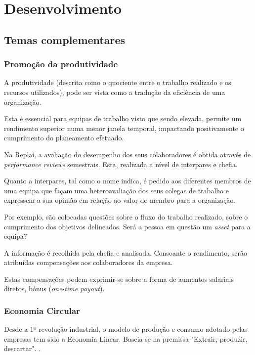 \chapter{Desenvolvimento}

\section{Temas complementares}

\subsection{Promoção da produtividade}

A produtividade (descrita como o quociente entre o trabalho realizado e os recursos utilizados), pode ser vista como a tradução da eficiência de uma organização.
 
Esta é essencial para equipas de trabalho visto que sendo elevada, permite um rendimento superior numa menor janela temporal, impactando positivamente o cumprimento do planeamento efetuado.
  
Na Replai, a avaliação do desempenho dos seus colaboradores é obtida através de \textit{performance reviews} semestrais. 
Esta, realizada a nível de interpares e chefia.  
  
Quanto a interpares, tal como o nome indica, é pedido aos diferentes membros de uma equipa que façam uma heteroavaliação dos seus colegas de trabalho e expressem a sua opinião em relação ao valor do membro para a organização.  
  
Por exemplo, são colocadas questões sobre o fluxo do trabalho realizado, sobre o cumprimento dos objetivos delineados. Será a pessoa em questão um \textit{asset} para a equipa?
  
A informação é recolhida pela chefia e analisada. Consoante o rendimento, serão atribuídas compensações aos colaboradores da empresa.
  
Estas compensações podem exprimir-se sobre a forma de aumentos salariais diretos, bónus (\textit{one-time payout}).



\subsection{Economia Circular}
Desde a 1º revolução industrial, o modelo de produção e consumo adotado pelas empresas tem sido a Economia Linear. Baseia-se na premissa "Extrair, produzir, descartar".
\cite{EconomiaLinear}.


